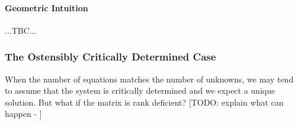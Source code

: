 \paragraph{Geometric Intuition} ...TBC...








\subsubsection{The Ostensibly Critically Determined Case}
When the number of equations matches the number of unknowns, we may tend to assume that the system is critically determined and we expect a unique solution. But what if the matrix is rank deficient? [TODO: explain what can happen - ] %


